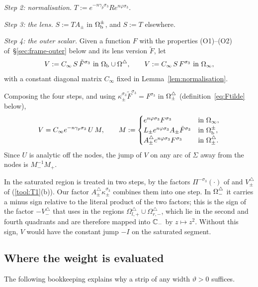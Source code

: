 \emph{Step 2: normalisation.} $T:=e^{-n\gamma_p\sigma_3}Re^{n\varphi\sigma_3}$.

\emph{Step 3: the lens.} $S:=TA_\pm$ in $\Omega_{\mathrm{b}}^\pm$, and $S:=T$ elsewhere.

\emph{Step 4: the outer scalar.} Given a function $F$ with the properties (O1)--(O2) of~\S\ref{sec:frame-outer}
below and its lens version $\tilde F$, let
\begin{equation}\label{eq:V}
  V:=C_\infty\,S\,\tilde F^{\sigma_3}\ \text{in }\Omega_{\mathrm{b}}\cup\Omega^{\triangle},\qquad V:=C_\infty\,S\,F^{\sigma_3}\ \text{in }\Omega_{\infty},
\end{equation}
with a constant diagonal matrix $C_\infty$ fixed in Lemma~\ref{lem:normalisation}.

Composing the four steps, and using $\kappa_\pm^{\sigma_3}\tilde F^{\sigma_3}=F^{\sigma_3}$ in $\Omega^{\triangle}_\pm$
(definition~\eqref{eq:Ftilde} below),
\begin{equation}\label{eq:VM}
  V=C_\infty e^{-n\gamma_p\sigma_3}\,U\,M,\qquad
  M:=\begin{cases}e^{n\varphi\sigma_3}F^{\sigma_3}&\text{in }\Omega_{\infty},\\
  L_\pm e^{n\varphi\sigma_3}A_\pm\tilde F^{\sigma_3}&\text{in }\Omega_{\mathrm{b}}^\pm,\\
  A^\triangle_\pm e^{n\varphi\sigma_3}F^{\sigma_3}&\text{in }\Omega^{\triangle}_\pm.\end{cases}
\end{equation}
Since $U$ is analytic off the nodes, the jump of $V$ on any arc of $\Sigma$ away from the nodes is $M_-^{-1}M_+$.

In \cite{WLXZ} the saturated region is treated in two steps, by the factors $\Pi^{-\sigma_3}(\cdot)$ of
\cite[(3.10)--(3.11)]{WLXZ} and $V^\triangle_\pm$ of \cite[(4.12)--(4.13)]{WLXZ} (\ref{tool:T1}(b)). Our factor
$A^\triangle_\pm\kappa_\pm^{\sigma_3}$ combines them into one step. In $\Omega^{\triangle}_-$ it carries a minus sign relative to
the literal product of the two factors; this is the sign of the factor $-V^\triangle_-$ that \cite[(4.12)]{WLXZ}
uses in the regions $\Omega^\triangle_{l,+}\cup\Omega^\triangle_{r,-}$, which lie in the second and fourth quadrants and are
therefore mapped into $\mathbb{C}_-$ by $z\mapsto z^2$. Without this sign, $V$ would have the constant jump $-I$ on the saturated
segment.

\subsection{Where the weight is evaluated}\label{sec:frame-where}
The following bookkeeping explains why a strip of any width $\vartheta>0$ suffices.

